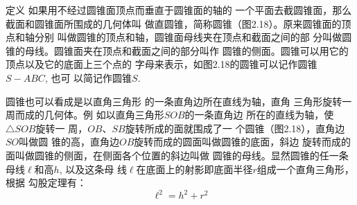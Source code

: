 \begin{figure}[htp]\centering
    \begin{minipage}[t]{0.48\textwidth}
    \centering
{}
    \caption{}
    \end{minipage}
    \begin{minipage}[t]{0.48\textwidth}
    \centering
{}
    \caption{}
    \end{minipage}
    \end{figure}

\begin{blk}
    {定义} 如果用不经过圆锥面顶点而垂直于圆锥面的轴的
一个平面去截圆锥面，那么截面和圆锥面所围成的几何体叫
做直圆锥，简称圆锥（图2.18）。原来圆锥面的顶点和轴分别
叫做圆锥的顶点和轴，圆锥面母线夹在顶点和截面之间的部
分叫做圆锥的母线。圆锥面夹在顶点和截面之间的部分叫作
圆锥的侧面。圆锥可以用它的顶点以及它的底面上三个点的
字母来表示，如图2.18的圆锥可以记作圆锥$S-ABC$, 也可
以简记作圆锥$S$.
\end{blk}

圆锥也可以看成是以直角三角形
的一条直角边所在直线为轴，直角
三角形旋转一周而成的几何体。例
如以直角三角形$SOB$的一条直角边
所在的直线为轴，使$\triangle SOB$旋转一
周，$OB$、$SB$旋转所成的面就围成了一
个圆锥（图2.18），直角边$SO$叫做圆
锥的高，直角边$OB$旋转而成的圆面叫做圆锥的底面，斜边
旋转而成的面叫做圆锥的侧面，在侧面各个位置的斜边叫做
圆锥的母线。显然圆锥的任一条母线$\ell$和高$h$, 以及这条母
线$\ell$在底面上的射影即底面半径$r$组成一个直角三角形，根据
勾股定理有：
\[\ell^2=h^2+r^2\]

